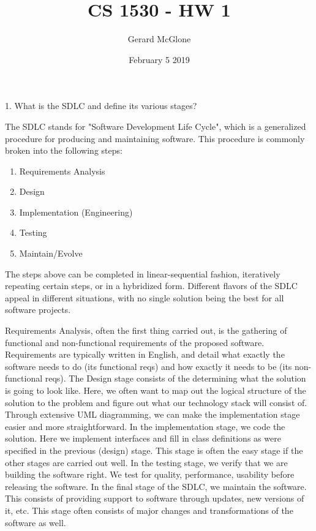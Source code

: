 \documentclass{article}
\title{CS 1530 - HW 1}
\author{Gerard McGlone }
\date{February 5 2019}
\begin{document}
\maketitle

\section{}
1. What is the SDLC and define its various stages?\newline

\noindent The SDLC stands for "Software Development Life Cycle", which is a generalized procedure for producing and maintaining software.  This procedure is commonly broken into the following steps:
\begin{enumerate}
    \item Requirements Analysis
    \item Design
    \item Implementation (Engineering)
    \item Testing
    \item Maintain/Evolve
\end{enumerate}
The steps above can be completed in linear-sequential fashion, iteratively repeating certain steps, or in a hybridized form.  Different flavors of the SDLC appeal in different situations, with no single solution being the best for all software projects.\newline

Requirements Analysis, often the first thing carried out, is the gathering of functional and non-functional requirements of the proposed software.  Requirements are typically written in English, and detail what exactly the software needs to do (its functional reqs) and how exactly it needs to be (its non-functional reqs).  The Design stage consists of the determining what the solution is going to look like.  Here, we often want to map out the logical structure of the solution to the problem and figure out what our technology stack will consist of.  Through extensive UML diagramming, we can make the implementation stage easier and more straightforward.  In the implementation stage, we code the solution.  Here we implement interfaces and fill in class definitions as were specified in the previous (design) stage.  This stage is often the easy stage if the other stages are carried out well.  In the testing stage, we verify that we are building the software right.  We test for quality, performance, usability before releasing the software.  In the final stage of the SDLC, we maintain the software.  This consists of providing support to software through updates, new versions of it, etc.  This stage often consists of major changes and transformations of the software as well.
\end{document}

